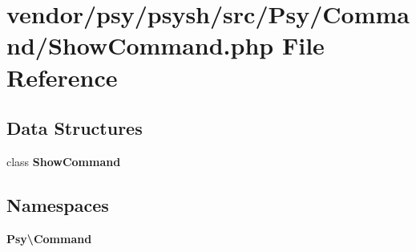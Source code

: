 \section{vendor/psy/psysh/src/\+Psy/\+Command/\+Show\+Command.php File Reference}
\label{_show_command_8php}
\subsection*{Data Structures}
\begin{DoxyCompactItemize}
\item 
class {\bf Show\+Command}
\end{DoxyCompactItemize}
\subsection*{Namespaces}
\begin{DoxyCompactItemize}
\item 
 {\bf Psy\textbackslash{}\+Command}
\end{DoxyCompactItemize}
